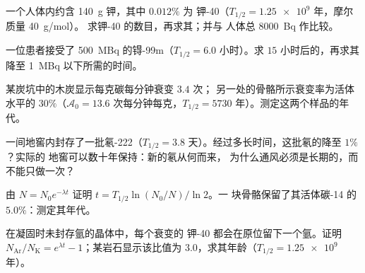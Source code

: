 \begin{exercise}[$\star\star$]\label{exo:g12:radioactive-decay:8}
一个人体内约含 \qty{140}{g} 钾，其中 $0.012\%$ 为
钾-40（$T_{1/2} = \num{1.25e9}$ 年，摩尔质量 \qty{40}{g/mol}）。
求钾-40 的数目，再求其；并与
人体总 \qty{8000}{Bq} 作比较。
\end{exercise}

\begin{exercise}[$\star\star$]\label{exo:g12:radioactive-decay:9}
一位患者接受了 \qty{500}{MBq} 的锝-99m（$T_{1/2} = 6.0$
小时）。求 $15$ 小时后的，再求其降至
\qty{1}{MBq} 以下所需的时间。
\end{exercise}

\begin{exercise}[$\star\star$]\label{exo:g12:radioactive-decay:10}
某炭坑中的木炭显示每克碳每分钟衰变 $3.4$ 次；
另一处的骨骼所示衰变率为活体水平的 $30\%$（$\mathcal A_0 = 13.6$
次每分钟每克，$T_{1/2} = \num{5730}$ 年）。测定这两个样品的年代。
\end{exercise}

\begin{exercise}[$\star\star$]\label{exo:g12:radioactive-decay:11}
一间地窖内封存了一批氡-222（$T_{1/2} = 3.8$
天）。经过多长时间，这批氡的降至 $1\%$？实际的
地窖可以数十年保持：新的氡从何而来，
为什么通风必须是长期的，而不能只做一次？
\end{exercise}

\begin{exercise}[$\star\star\star$]\label{exo:g12:radioactive-decay:12}
由 $N = N_0 e^{-\lambda t}$ 证明 $t = T_{1/2}\ln(N_0/N)/\ln 2$。一
块骨骼保留了其活体碳-14 的 $5.0\%$：测定其年代。
\end{exercise}

\begin{exercise}[$\star\star\star$]\label{exo:g12:radioactive-decay:13}
在凝固时未封存氩的晶体中，每个衰变的
钾-40 都会在原位留下一个氩。证明
$N_{\mathrm{Ar}}/N_{\mathrm K} = e^{\lambda t} - 1$；某岩石显示该比值为
$3.0$，求其年龄（$T_{1/2} = \num{1.25e9}$ 年）。
\end{exercise}

